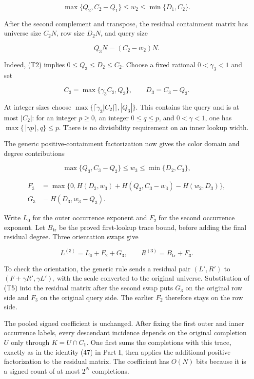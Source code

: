 \[
\max\{Q_2,C_2-Q_1\}\le w_2\le\min\{D_1,C_2\}.
\tag{T2}
\]

After the second complement and transpose, the residual containment matrix has universe size \(C_2N\), row size \(D_2N\), and query size

\[
Q_3N=(C_2-w_2)N.
\]

Indeed, (T2) implies \(0\le Q_3\le D_2\le C_2\). Choose a fixed rational \(0<\gamma_3<1\) and set

\[
C_3=\max\{\gamma_3C_2,Q_3\},\qquad D_3=C_3-Q_3.
\tag{T3}
\]

At integer sizes choose \(\max\{\lceil\gamma_3|C_2|\rceil,|Q_3|\}\). This contains the query and is at most \(|C_2|\): for an integer \(p\ge0\), an integer \(0\le q\le p\), and \(0<\gamma<1\), one has \(\max\{\lceil\gamma p\rceil,q\}\le p\). There is no divisibility requirement on an inner lookup width.

The generic positive-containment factorization now gives the color domain and degree contributions

\[
\max\{Q_3,C_3-Q_2\}\le w_3\le\min\{D_2,C_3\},
\tag{T4}
\]

\[
\begin{aligned}
F_3&=\max\{0,H(D_2,w_3)+H(Q_2,C_3-w_3)-H(w_2,D_3)\},\\
G_3&=H(D_3,w_3-Q_3).
\end{aligned}
\tag{T5}
\]

Write \(L_0\) for the outer occurrence exponent and \(F_2\) for the second occurrence exponent. Let \(B_{\mathrm{tr}}\) be the proved first-lookup trace bound, before adding the final residual degree. Three orientation swaps give

\[
L^{(3)}=L_0+F_2+G_3,\qquad
R^{(3)}=B_{\mathrm{tr}}+F_3.
\tag{T6}
\]

To check the orientation, the generic rule sends a residual pair \((L',R')\) to \((F+\gamma R',\gamma L')\), with the scale converted to the original universe. Substitution of (T5) into the residual matrix after the second swap puts \(G_3\) on the original row side and \(F_3\) on the original query side. The earlier \(F_2\) therefore stays on the row side.

The pooled signed coefficient is unchanged. After fixing the first outer and inner occurrence labels, every descendant incidence depends on the original completion \(U\) only through \(K=U\cap C_1\). One first sums the completions with this trace, exactly as in the identity (47) in Part I, then applies the additional positive factorization to the residual matrix. The coefficient has \(O(N)\) bits because it is a signed count of at most \(2^N\) completions.

